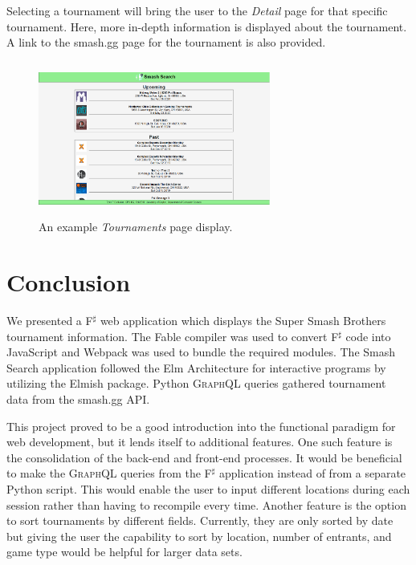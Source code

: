 \documentclass[sigconf]{acmart}
\begin{document}
Selecting a tournament will bring the user to the \textit{Detail} page for that specific tournament. Here, more in-depth information is displayed about the tournament. A link to the smash.gg page for the tournament is also provided.

\begin{figure}
\includegraphics[height=2.0in, width=3in]{smashsearch}
\caption{An example \textit{Tournaments} page display.}\label{smashsearch}\end{figure}

\section{Conclusion}

We presented a F$^{\sharp}$ web application which displays the Super Smash Brothers tournament information. The Fable compiler was used to convert F$^{\sharp}$ code into JavaScript and Webpack was used to bundle the required modules. The Smash Search application followed the Elm Architecture for interactive programs by utilizing the Elmish package. Python \textsc{GraphQL} queries gathered tournament data from the smash.gg \textsc{API}.

This project proved to be a good introduction into the functional paradigm for web development, but it lends itself to additional features. One such feature is the consolidation of the back-end and front-end processes. It would be beneficial to make the \textsc{GraphQL} queries from the F$^{\sharp}$ application instead of from a separate Python script. This would enable the user to input different locations during each session rather than having to recompile every time. Another feature is the option to sort tournaments by different fields. Currently, they are only sorted by date but giving the user the capability to sort by location, number of entrants, and game type would be helpful for larger data sets.

\balance



\end{document}
